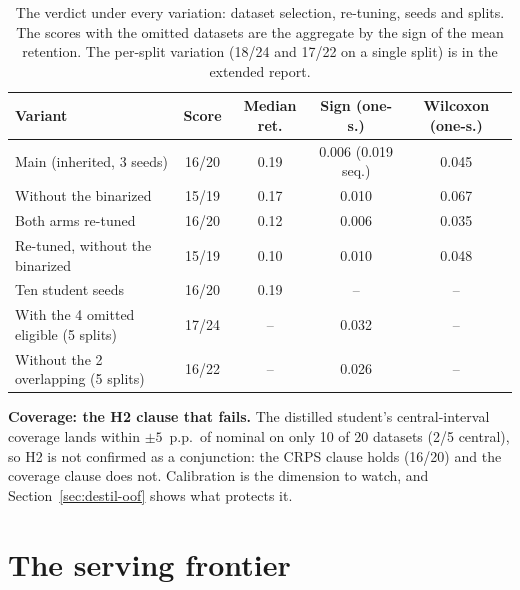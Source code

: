 \begin{table}[htb]
\centering
\caption[Robustness of the distributional distillation verdict]{The
verdict under every variation: dataset selection, re-tuning, seeds
and splits. The scores with the omitted datasets are the aggregate
by the sign of the mean retention. The per-split variation (18/24
and 17/22 on a single split) is in the extended report.}
\label{tab:destil-robustez}
\small
\setlength{\tabcolsep}{3pt}
\begin{tabular}{lcccc}
\toprule
Variant & Score & Median ret. & Sign (one-s.) & Wilcoxon (one-s.) \\
\midrule
Main (inherited, 3 seeds) & 16/20 & 0.19 & 0.006 (0.019 seq.) & 0.045 \\
Without the binarized & 15/19 & 0.17 & 0.010 & 0.067 \\
Both arms re-tuned & 16/20 & 0.12 & 0.006 & 0.035 \\
Re-tuned, without the binarized & 15/19 & 0.10 & 0.010 & 0.048 \\
Ten student seeds & 16/20 & 0.19 & -- & -- \\
With the 4 omitted eligible (5 splits) & 17/24 & -- & 0.032 & -- \\
Without the 2 overlapping (5 splits) & 16/22 & -- & 0.026 & -- \\
\bottomrule
\end{tabular}
\end{table}

\textbf{Coverage: the H2 clause that fails.} The distilled student's
central-interval coverage lands within $\pm5$~p.p.\ of nominal on
only 10 of 20 datasets (2/5 central), so H2 is not confirmed
as a conjunction: the CRPS clause holds (16/20) and the coverage
clause does not. Calibration is the dimension to watch, and Section~\ref{sec:destil-oof} shows what protects it.

\section{The serving frontier}
\label{sec:destil-fronteira}

